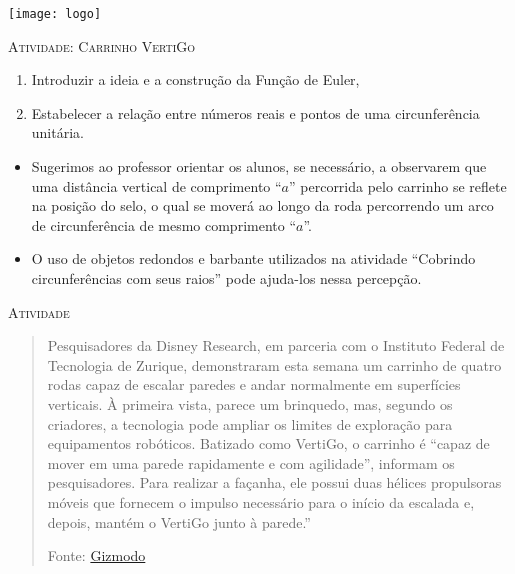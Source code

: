 \documentclass[10 pt,usenames,dvipsnames, oneside]{article}
\begin{document}
\begin{center}
  \begin{minipage}[l]{3cm}
\texttt{[image: logo]}    
\end{minipage}\hfill
\begin{minipage}[r]{.8\textwidth}
 {\Large \scshape Atividade: Carrinho VertiGo}  
\end{minipage}
\end{center}
\vspace{.2cm}

\ifdefined\prof

\begin{goals}
\begin{enumerate}
\item Introduzir a ideia e a construção da Função de Euler,
\item Estabelecer a relação entre números reais e pontos de uma circunferência unitária.
\end{enumerate}

\tcblower

\begin{itemize}
\item Sugerimos ao professor orientar os alunos, se necessário, a observarem que uma distância vertical de comprimento “$a$”{} percorrida pelo carrinho se reflete na posição do selo, o qual se moverá ao longo da roda percorrendo um arco de circunferência de mesmo comprimento “$a$”.
\item  O uso de objetos redondos e barbante utilizados na atividade “Cobrindo circunferências com seus raios”{} pode ajuda-los nessa percepção.
\end{itemize}
\end{goals}

\bigskip
\begin{center}
{\large \scshape Atividade}
\end{center}
\fi

\begin{quote}

Pesquisadores da Disney Research, em parceria com o Instituto Federal de Tecnologia de Zurique, demonstraram esta semana um carrinho de quatro rodas capaz de escalar paredes e andar normalmente em superfícies verticais.
À primeira vista, parece um brinquedo, mas, segundo os criadores, a tecnologia pode ampliar os limites de exploração para equipamentos robóticos. Batizado como VertiGo, o carrinho é “capaz de mover em uma parede rapidamente e com agilidade”, informam os pesquisadores. Para realizar a façanha, ele possui duas hélices propulsoras móveis que fornecem o impulso necessário para o início da escalada e, depois, mantém o VertiGo junto à parede.”

\flushright
Fonte: \href{https://gizmodo.uol.com.br/o-novo-robo-da-disney-escala-paredes-como-uma-lagartixa/}{Gizmodo}
\end{quote}
\end{document}
